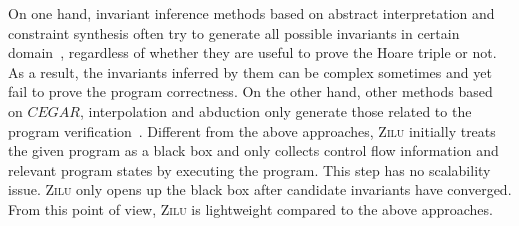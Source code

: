 On one hand, invariant inference methods based on abstract interpretation and constraint synthesis
often try to generate all possible invariants in certain domain~\cite{mine2006octagon,vincent2009subpolyhedra,ashutosh2009invgen},
regardless of whether they are useful to prove the Hoare triple or not.
As a result, the invariants inferred by them can be complex sometimes and yet fail to prove the program correctness.
On the other hand, other methods based on $\mathit{CEGAR}$, interpolation and abduction only generate those related to the program verification~\cite{isil2013inductive}.
Different from the above approaches, \textsc{Zilu} initially treats the given program as a black box and only collects control flow information and relevant program states by executing the program.
This step has no scalability issue.
\textsc{Zilu} only opens up the black box after candidate invariants have converged.
From this point of view, \textsc{Zilu} is lightweight compared to the above approaches.

